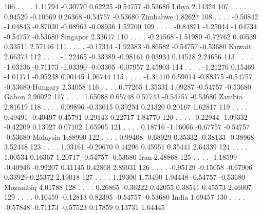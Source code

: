 \documentclass{article}
\begin{document}
\begin{Woutput}
106  .       .       .       .       1.11794 -0.30770  0.62225 -0.54757 -0.53680 Libya     2.14324
107  .       .       .       .       0.94529 -0.10569  0.26368 -0.54757 -0.53680 Zimbabwe  1.82627
108  .       .       .       .      -0.50842 -1.04843 -0.87030 -0.08963 -0.08936           1.52700
109  .       .       .       .      -0.84871 -1.25044 -1.04734 -0.54757 -0.53680 Singapor  2.33617
110  .       .       .       .      -0.21568 -1.51980 -0.72762  0.40539  0.33511           2.57146
111  .       .       .       .      -0.17314 -1.92383 -0.86582 -0.54757 -0.53680 Kuwait    2.66373
112  .       .       .       .      -1.22465 -0.33389 -0.98161  0.03934  0.14518           2.24656
113  .       .       .       .      -1.03136 -0.71173 -1.03390 -0.03305 -0.07957           2.45903
114  .       .       .       .      -1.21276  0.15469 -1.01171 -0.05238  0.00145           1.96744
115  .       .       .       .      -1.31410  0.59014 -0.88375 -0.54757 -0.53680 Hungary   2.34058
116  .       .       .       .       0.77265  1.35331  1.09287 -0.54757 -0.53680 Gabon     2.90022
117  .       .       .       .       1.65088  0.65748  0.57743 -0.54757 -0.53680 Zambia    2.81619
118  .       .       .       .       0.09896 -0.33015  0.39254  0.21320  0.20167           1.62817
119  .       .       .       .       0.49491 -0.40497  0.45791  0.29143  0.22717           1.84770
120  .       .       .       .      -0.22944 -1.09332 -0.42209  0.13927  0.07102           1.65905
121  .       .       .       .       0.18716 -1.16066 -0.67757 -0.54757 -0.53680 Malaysia  1.88990
122  .       .       .       .       0.99408 -0.68929  0.35332 -0.38133 -0.38968           3.52448
123  .       .       .       .       1.03161 -0.20670  0.44296  0.45951  0.35441           2.64339
124  .       .       .       .       1.00534  0.16367  1.20717 -0.54757 -0.53680 Iran      2.48868
125  .       .       .       .      -1.18599 -0.40946 -0.99207  0.41145  0.42868           2.89031
126  .       .       .       .      -0.95129 -0.15058 -0.67906  0.33929  0.25372           2.19018
127  .       .       .       .       1.19300  1.73490  1.94448 -0.54757 -0.53680 Mozambiq  4.01788
128  .       .       .       .       0.26865 -0.36222  0.42055  0.38541  0.45573           2.46007
129  .       .       .       .       0.10459 -0.12813  0.82395 -0.54757 -0.53680 India     1.69457
130  .       .       .       .      -0.57848 -0.71173 -0.57523  0.17859  0.13731           1.64445


\end{Woutput}
\end{document}
